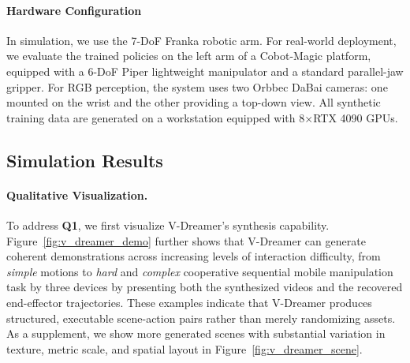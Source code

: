 \paragraph{Hardware Configuration}
In simulation, we use the 7-DoF Franka robotic arm. For real-world deployment, we evaluate the trained policies on the left arm of a Cobot-Magic platform, equipped with a 6-DoF Piper lightweight manipulator and a standard parallel-jaw gripper. For RGB perception, the system uses two Orbbec DaBai cameras: one mounted on the wrist and the other providing a top-down view. All synthetic training data are generated on a workstation equipped with 8$\times$RTX 4090 GPUs.



\subsection{Simulation Results}
\label{sec:sim_results}

\paragraph{Qualitative Visualization.}


To address \textbf{Q1}, we first visualize V-Dreamer’s synthesis capability. Figure~\ref{fig:v_dreamer_demo} further shows that V-Dreamer can generate coherent demonstrations across increasing levels of interaction difficulty, from \textit{simple} motions to \textit{hard} and \textit{complex} cooperative sequential mobile manipulation task by three devices by presenting both the synthesized videos and the recovered end-effector trajectories. These examples indicate that V-Dreamer produces structured, executable scene-action pairs rather than merely randomizing assets. As a supplement, we show more generated scenes with substantial variation in texture, metric scale, and spatial layout in Figure~\ref{fig:v_dreamer_scene}. 


